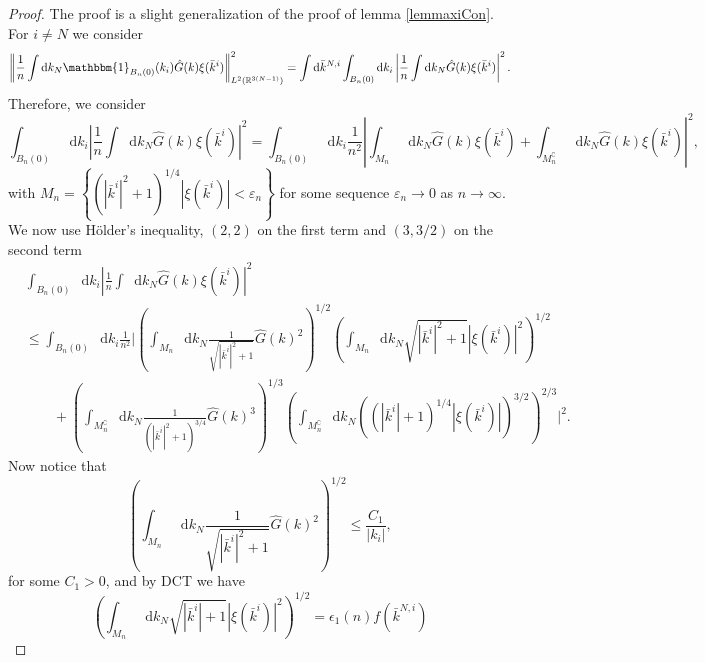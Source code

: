 \documentclass[a4paper,11pt]{article}
\newcommand{\norm}[1]{\left\lVert #1 \right\rVert}
\newcommand{\abs}[1]{\left\lvert #1 \right\rvert}
\newcommand*\diff{\mathop{}\!\mathrm{d}}
\newcommand{\R}{\mathbb{R}}
\numberwithin{equation}{section}
\begin{document}
\begin{proof}
	The proof is a slight generalization of the proof of lemma \ref{lemmaxiCon}. For $ i\neq N $ we consider\begin{equation}
	\begin{aligned}
	\norm{\frac{1}{n}\int \diff k_N \mathbbm{1}_{B_n(0)}(k_i)\hat{G}(k)\xi(\bar{k}^i)}^2_{L^{2}(\R^{3(N-1)})}=\int\diff\bar{k}^{N,i}\int_{B_n(0)}\diff k_i\left\lvert\frac{1}{n}\int \diff k_N\hat{G}(k)\xi(\bar{k}^i)\right\rvert^2.
	\end{aligned}
	\end{equation}
	Therefore, we consider\begin{equation}
	\int_{B_n(0)}\diff k_i\left\lvert\frac{1}{n}\int \diff k_N\hat{G}(k)\xi(\bar{k}^i)\right\rvert^2=\int_{B_n(0)}\diff k_i\frac{1}{n^2}\left\lvert\int_{M_n} \diff k_N\hat{G}(k)\xi(\bar{k}^i)+\int_{M_n^\complement} \diff k_N\hat{G}(k)\xi(\bar{k}^i)\right\rvert^2,
	\end{equation}
	with $ M_n=\left\{\left(\abs{\bar{k}^i}^2+1\right)^{1/4}\abs{\xi(\bar{k}^i)}<\varepsilon_n\right\} $ for some sequence $ \varepsilon_n\to0 $ as $ n\to\infty $. We now use H\"older's inequality, $ (2,2) $ on the first term and $ (3,3/2) $ on the second term
	\begin{equation}
	\begin{aligned}
	&\int_{B_n(0)}\diff k_i\left\lvert\frac{1}{n}\int \diff k_N\hat{G}(k)\xi(\bar{k}^i)\right\rvert^2\\&\leq\int_{B_n(0)}\diff k_i\frac{1}{n^2}\Bigg\lvert\left(\int_{M_n} \diff k_N\frac{1}{\sqrt{\abs{\bar{k}^i}^2+1}}\hat{G}(k)^2\right)^{1/2}\left(\int_{M_n}\diff k_N\sqrt{\abs{\bar{k}^i}^2+1}\abs{\xi(\bar{k}^i)}^2\right)^{1/2}\\&\qquad
	+\left(\int_{M_n^\complement} \diff k_N\frac{1}{\left(\abs{\bar{k}^i}^2+1\right)^{3/4}}\hat{G}(k)^3\right)^{1/3}\left(\int_{M_n^\complement} \diff k_N\left(\left(\abs{\bar{k}^i}+1\right)^{1/4}\abs{\xi(\bar{k}^i)}\right)^{3/2}\right)^{2/3}\Bigg\rvert^2.
		\end{aligned}
	\end{equation}
	Now notice that \begin{equation}
	\left(\int_{M_n} \diff k_N\frac{1}{\sqrt{\abs{\bar{k}^i}^2+1}}\hat{G}(k)^2\right)^{1/2}\leq \frac{C_1}{\abs{k_i}},
	\end{equation}
	for some $ C_1>0 $, and by DCT we have \begin{equation}
	\left(\int_{M_n}\diff k_N\sqrt{\abs{\bar{k}^i}+1}\abs{\xi(\bar{k}^i)}^2\right)^{1/2}=\epsilon_1(n)f(\bar{k}^{N,i})

\end{equation}
\end{proof}
\end{document}

